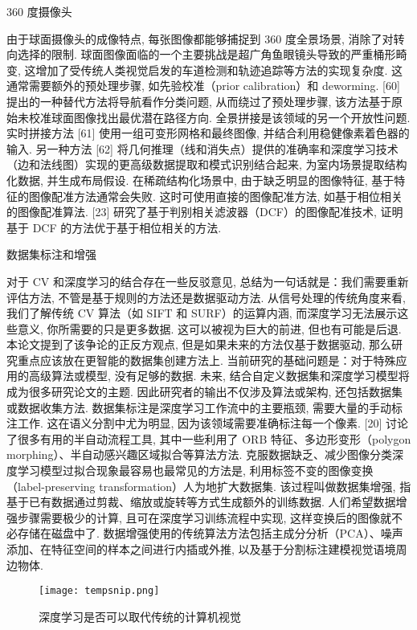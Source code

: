 360 度摄像头

由于球面摄像头的成像特点, 每张图像都能够捕捉到 360 度全景场景, 消除了对转向选择的限制. 球面图像面临的一个主要挑战是超广角鱼眼镜头导致的严重桶形畸变, 这增加了受传统人类视觉启发的车道检测和轨迹追踪等方法的实现复杂度. 这通常需要额外的预处理步骤, 如先验校准（prior calibration）和 deworming. [60] 提出的一种替代方法将导航看作分类问题, 从而绕过了预处理步骤, 该方法基于原始未校准球面图像找出最优潜在路径方向.
全景拼接是该领域的另一个开放性问题. 实时拼接方法 [61] 使用一组可变形网格和最终图像, 并结合利用稳健像素着色器的输入. 另一种方法 [62] 将几何推理（线和消失点）提供的准确率和深度学习技术（边和法线图）实现的更高级数据提取和模式识别结合起来, 为室内场景提取结构化数据, 并生成布局假设. 在稀疏结构化场景中, 由于缺乏明显的图像特征, 基于特征的图像配准方法通常会失败. 这时可使用直接的图像配准方法, 如基于相位相关的图像配准算法. [23] 研究了基于判别相关滤波器（DCF）的图像配准技术, 证明基于 DCF 的方法优于基于相位相关的方法.

数据集标注和增强

对于 CV 和深度学习的结合存在一些反驳意见, 总结为一句话就是：我们需要重新评估方法, 不管是基于规则的方法还是数据驱动方法. 从信号处理的传统角度来看, 我们了解传统 CV 算法（如 SIFT 和 SURF）的运算内涵, 而深度学习无法展示这些意义, 你所需要的只是更多数据. 这可以被视为巨大的前进, 但也有可能是后退. 本论文提到了该争论的正反方观点, 但是如果未来的方法仅基于数据驱动, 那么研究重点应该放在更智能的数据集创建方法上.
当前研究的基础问题是：对于特殊应用的高级算法或模型, 没有足够的数据. 未来, 结合自定义数据集和深度学习模型将成为很多研究论文的主题. 因此研究者的输出不仅涉及算法或架构, 还包括数据集或数据收集方法. 数据集标注是深度学习工作流中的主要瓶颈, 需要大量的手动标注工作. 这在语义分割中尤为明显, 因为该领域需要准确标注每一个像素. [20] 讨论了很多有用的半自动流程工具, 其中一些利用了 ORB 特征、多边形变形（polygon morphing）、半自动感兴趣区域拟合等算法方法.
克服数据缺乏、减少图像分类深度学习模型过拟合现象最容易也最常见的方法是, 利用标签不变的图像变换（label-preserving transformation）人为地扩大数据集. 该过程叫做数据集增强, 指基于已有数据通过剪裁、缩放或旋转等方式生成额外的训练数据. 人们希望数据增强步骤需要极少的计算, 且可在深度学习训练流程中实现, 这样变换后的图像就不必存储在磁盘中了. 数据增强使用的传统算法方法包括主成分分析（PCA）、噪声添加、在特征空间的样本之间进行内插或外推, 以及基于分割标注建模视觉语境周边物体.

\begin{figure}[H]
\centering
\texttt{[image: tempsnip.png]}
\caption{深度学习是否可以取代传统的计算机视觉}
\label{tempsnip}
\vspace{-0.4cm}
\end{figure}

